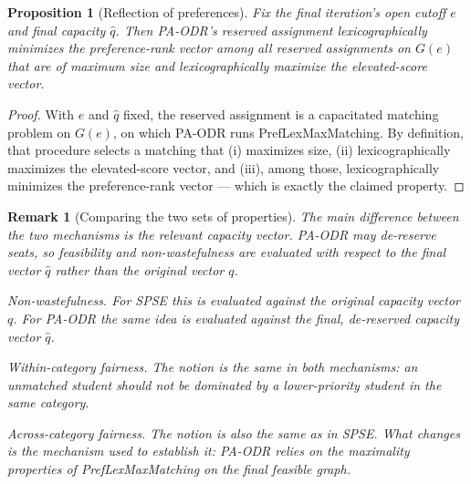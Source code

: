 \documentclass[10pt]{article}
\newtheorem{proposition}{Proposition}
\newtheorem{example}{Example}
\newtheorem{remark}{Remark}
\newcommand{\1}{\mathbf{1}}
\begin{document}
\begin{proposition}[Reflection of preferences]\label{prop:pa-odr-preference}
Fix the final iteration's open cutoff $e$ and final capacity $\hat q$. Then PA-ODR's reserved assignment lexicographically minimizes the preference-rank vector among all reserved assignments on $G(e)$ that are of maximum size and lexicographically maximize the elevated-score vector.
\end{proposition}
\begin{proof}
With $e$ and $\hat q$ fixed, the reserved assignment is a capacitated matching problem on $G(e)$, on which PA-ODR runs PrefLexMaxMatching. By definition, that procedure selects a matching that (i) maximizes size, (ii) lexicographically maximizes the elevated-score vector, and (iii), among those, lexicographically minimizes the preference-rank vector — which is exactly the claimed property.
\end{proof}

\begin{remark}[Comparing the two sets of properties]
\label{rem:spse-vs-paodr}
The main difference between the two mechanisms is the relevant capacity vector. PA-ODR may de-reserve seats, so feasibility and non-wastefulness are evaluated with respect to the final vector $\hat q$ rather than the original vector $q$.

\emph{Non-wastefulness.} For SPSE this is evaluated against the original capacity vector $q$. For PA-ODR the same idea is evaluated against the final, de-reserved capacity vector $\hat q$.

\emph{Within-category fairness.} The notion is the same in both mechanisms: an unmatched student should not be dominated by a lower-priority student in the same category.

\emph{Across-category fairness.} The notion is also the same as in SPSE. What changes is the mechanism used to establish it: PA-ODR relies on the maximality properties of PrefLexMaxMatching on the final feasible graph.
\end{remark}


\end{document}
